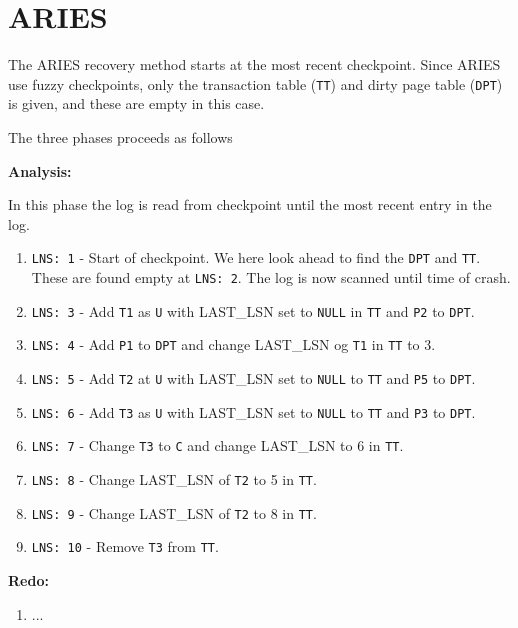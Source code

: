 
\section{ARIES}

The ARIES recovery method starts at the most recent checkpoint. Since ARIES
use fuzzy checkpoints, only the transaction table ({\tt TT}) and dirty page
table ({\tt DPT}) is given, and these are empty in this case.

\noindent
The three phases proceeds as follows

\noindent
{\bf Analysis:}

In this phase the log is read from checkpoint until the most recent entry in
the log.
\begin{enumerate}
\item {\tt LNS: 1} - Start of checkpoint. We here look ahead to find the
{\tt DPT} and {\tt TT}. These are found empty at {\tt LNS: 2}. The log is now
scanned until time of crash.
\item {\tt LNS: 3} - Add {\tt T1} as {\tt U} with LAST\_LSN set to {\tt NULL} in
{\tt TT} and {\tt P2} to {\tt DPT}.
\item {\tt LNS: 4} - Add {\tt P1} to {\tt DPT} and change LAST\_LSN og
    {\tt T1} in {\tt TT} to 3.
\item {\tt LNS: 5} - Add {\tt T2} at {\tt U} with LAST\_LSN set to {\tt NULL}
    to {\tt TT} and {\tt P5} to {\tt DPT}.
\item {\tt LNS: 6} - Add {\tt T3} as {\tt U} with LAST\_LSN set to {\tt NULL}
    to {\tt TT} and {\tt P3} to {\tt DPT}.
\item {\tt LNS: 7} - Change {\tt T3} to {\tt C} and change LAST\_LSN to 6 in {\tt TT}.
\item {\tt LNS: 8} - Change LAST\_LSN of {\tt T2} to 5 in {\tt TT}.
\item {\tt LNS: 9} - Change LAST\_LSN of {\tt T2} to 8 in {\tt TT}.
\item {\tt LNS: 10} - Remove {\tt T3} from {\tt TT}.
\end{enumerate}

\noindent
{\bf Redo:}

\begin{enumerate}
\item ...
\end{enumerate}

